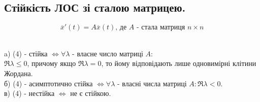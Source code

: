 \documentclass[14pt,a4paper]{scrartcl}
\theoremstyle{definition}
\theoremstyle{definition}
\theoremstyle{definition}
\begin{document}
\subsection{Стійкість ЛОС зі сталою матрицею.}

\begin{equation}
\overline{x} ' (t) = A \overline{x} (t) \text{, де $A$ - стала матриця $n \times n$}
\end{equation}
\begin{boxteo} \quad \\
a) (4) - стійка $ \Longleftrightarrow  \forall \lambda $ - власне число матриці $A$: \\
$\Re \lambda \leq 0$, причому якщо $ \Re \lambda = 0$, то йому відповідають лише одновимірні клітини Жордана. \\
б) (4) - асимптотично стійка $ \Longleftrightarrow \forall \lambda $ - власні числа матриці $A: \Re \lambda < 0 $.\\
в) (4) - нестійка $ \Longleftrightarrow $ не є стійкою.
\end{boxteo}
\end{document}
